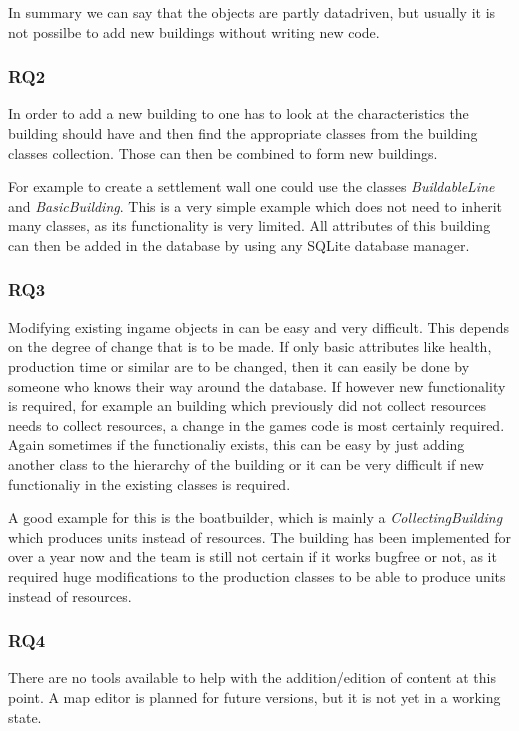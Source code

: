 In summary we can say that the objects are partly datadriven, but usually it is not possilbe to add new buildings
without writing new code.

\subsubsection{RQ2}
In order to add a new building to \UH{} one has to look at the characteristics the building should have and
then find the appropriate classes from the \UH{} building classes collection. Those can then be combined to
form new buildings.

For example to create a settlement wall one could use the classes \textit{BuildableLine} and
\textit{BasicBuilding}. This is a very simple example which does not need to inherit many classes, as its functionality
is very limited. All attributes of this building can then be added in the database by using any SQLite database manager.

\subsubsection{RQ3}
Modifying existing ingame objects in \UH{} can be easy and very difficult. This depends on the degree of
change that is to be made. If only basic attributes like health, production time or similar are to be changed, then it
can easily be done by someone who knows their way around the database. If however new functionality is required, for
example an building which previously did not collect resources needs to collect resources, a change in the games code is
most certainly required. Again sometimes if the functionaliy exists, this can be easy by just adding another class to
the hierarchy of the building or it can be very difficult if new functionaliy in the existing classes is required.

A good example for this is the boatbuilder, which is mainly a \textit{CollectingBuilding} which produces units instead of
resources. The building has been implemented for over a year now and the team is still not certain if it works bugfree
or not, as it required huge modifications to the production classes to be able to produce units instead of resources.

\subsubsection{RQ4}
There are no tools available to help with the addition/edition of content at this point. A map editor is planned for
future versions, but it is not yet in a working state.


